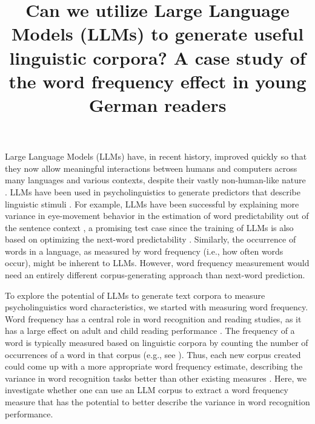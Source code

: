 \documentclass[doc, a4paper]{apa7}
\title{Can we utilize Large Language Models (LLMs) to generate useful linguistic corpora? A case study of the word frequency effect in young German readers}
\begin{document}
\maketitle

Large Language Models (LLMs) have, in recent history, improved quickly so that they now allow meaningful interactions between humans and computers across many languages \citep{chang_when_2023, lai_chatgpt_2023} and various contexts, despite their vastly non-human-like nature \citep{min_recent_2021, singhal_large_2023, kasneci_chatgpt_2023}. LLMs have been used in psycholinguistics to generate predictors that describe linguistic stimuli \citep{trott_can_2024}. For example, LLMs have been successful by explaining more variance in eye-movement behavior in the estimation of word predictability out of the sentence context \citep{hofmann_language_2022, chandra_synthetic_2023, heilbron_prediction_2021}, a promising test case since the training of LLMs is also based on optimizing the next-word predictability \citep{tay2022efficienttransformerssurvey}.  Similarly, the occurrence of words in a language, as measured by word frequency (i.e., how often words occur), might be inherent to LLMs. However, word frequency measurement would need an entirely different corpus-generating approach than next-word prediction.

To explore the potential of LLMs to generate text corpora to measure psycholinguistics word characteristics, we started with measuring word frequency. Word frequency has a central role in word recognition and reading studies, as it has a large effect on adult and child reading performance \cite{brysbaert_impact_2016,brysbaert_word_2018,gregorova_access_2023,schroter_developmental_2017, kliegl_length_2004,hawelka_dual-route_2010}. The frequency of a word is typically measured based on linguistic corpora by counting the number of occurrences of a word in that corpus (e.g., see \cite{brysbaert_word_2011,baayen_celex_1993,schroeder_childlex_2015,heister_dlexdb_2011}). Thus, each new corpus created could come up with a more appropriate word frequency estimate, describing the variance in word recognition tasks better than other existing measures \cite{brysbaert_word_2011}. Here, we investigate whether one can use an LLM corpus to extract a word frequency measure that has the potential to better describe the variance in word recognition performance. 
\end{document}
